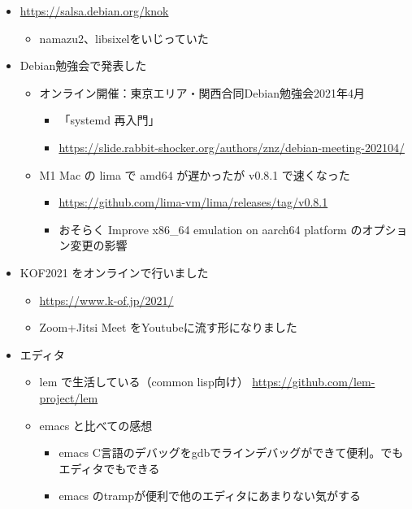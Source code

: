 \documentclass[mingoth,a4paper]{jsarticle}
\begin{document}

\begin{itemize}
\item \url{https://salsa.debian.org/knok}
  \begin{itemize}
  \item namazu2、libsixelをいじっていた
  \end{itemize}
\end{itemize}


\begin{itemize}
\item Debian勉強会で発表した
  \begin{itemize}
  \item オンライン開催：東京エリア・関西合同Debian勉強会2021年4月
    \begin{itemize}
    \item「systemd 再入門」
    \item \url{https://slide.rabbit-shocker.org/authors/znz/debian-meeting-202104/}
    \end{itemize}
  \item M1 Mac の lima で amd64 が遅かったが v0.8.1 で速くなった
    \begin{itemize}
    \item \url{https://github.com/lima-vm/lima/releases/tag/v0.8.1}
    \item おそらく Improve x86\_64 emulation on aarch64 platform のオプション変更の影響
    \end{itemize}
  \end{itemize}
\end{itemize}


\begin{itemize}
\item KOF2021 をオンラインで行いました
  \begin{itemize}
  \item \url{https://www.k-of.jp/2021/}
  \item Zoom+Jitsi Meet をYoutubeに流す形になりました
  \end{itemize}
\end{itemize}


\begin{itemize}
\item エディタ
  \begin{itemize}
  \item lem で生活している（common lisp向け） \url{https://github.com/lem-project/lem}
  \item emacs と比べての感想
    \begin{itemize}
    \item emacs C言語のデバッグをgdbでラインデバッグができて便利。でもエディタでもできる
    \item emacs のtrampが便利で他のエディタにあまりない気がする
    \end{itemize}
  \end{itemize}
\end{itemize}
\end{document}
